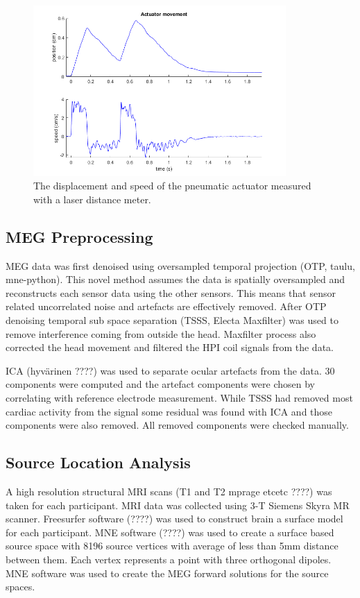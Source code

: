 \documentclass[]{article}
\begin{document}
\begin{figure}
    \centering
    \includegraphics[height=6.5cm]{images/actuator_movement.png}
    \caption{The displacement and speed of the pneumatic actuator measured with a laser distance meter.}
    \label{fig:actuator-movement}
\end{figure}

\subsection*{MEG Preprocessing}

MEG data was first denoised using oversampled temporal projection (OTP, taulu, mne-python). This novel method assumes the data is spatially oversampled and reconstructs each sensor data using the other sensors. This means that sensor related uncorrelated noise and artefacts are effectively removed. After OTP denoising temporal sub space separation (TSSS, Electa Maxfilter) was used to remove interference coming from outside the head. Maxfilter process also corrected the head movement and filtered the HPI coil signals from the data. 

ICA (hyvärinen ????) was used to separate ocular artefacts from the data. 30 components were computed and the artefact components were chosen by correlating with reference electrode measurement. While TSSS had removed most cardiac activity from the signal some residual was found with ICA and those components were also removed. All removed components were checked manually.


\subsection*{Source Location Analysis}

A high resolution structural MRI scans (T1 and T2 mprage etcetc ????) was taken for each participant. MRI data was collected using 3-T Siemens Skyra MR scanner. Freesurfer software (????) was used to construct brain a surface model for each participant. MNE software (????) was used to create a surface based source space with 8196 source vertices with average of less than 5mm distance between them. Each vertex represents a point with three orthogonal dipoles. MNE software was used to create the MEG forward solutions for the source spaces.
\end{document}
